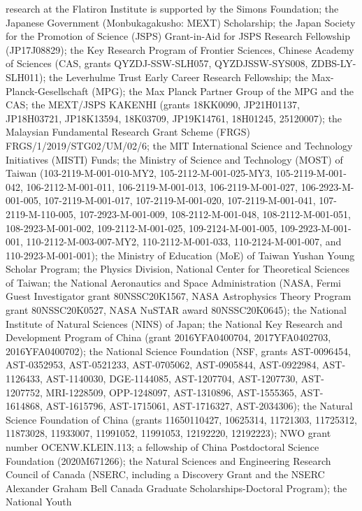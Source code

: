 research at the Flatiron Institute is supported by the Simons Foundation; 
the Japanese Government (Monbukagakusho:
MEXT) Scholarship; the Japan Society for
the Promotion of Science (JSPS) Grant-in-Aid for JSPS
Research Fellowship (JP17J08829); the Key Research
Program of Frontier Sciences, Chinese Academy of
Sciences (CAS, grants QYZDJ-SSW-SLH057, QYZDJSSW-SYS008, ZDBS-LY-SLH011); 
the Leverhulme Trust Early Career Research
Fellowship; the Max-Planck-Gesellschaft (MPG);
the Max Planck Partner Group of the MPG and the
CAS; the MEXT/JSPS KAKENHI (grants 18KK0090, JP21H01137,
JP18H03721, JP18K13594, 18K03709, JP19K14761, 18H01245, 25120007); the Malaysian Fundamental Research Grant Scheme (FRGS) FRGS/1/2019/STG02/UM/02/6; the MIT International Science
and Technology Initiatives (MISTI) Funds; 
the Ministry of Science and Technology (MOST) of Taiwan (103-2119-M-001-010-MY2, 105-2112-M-001-025-MY3, 105-2119-M-001-042, 106-2112-M-001-011, 106-2119-M-001-013, 106-2119-M-001-027, 106-2923-M-001-005, 107-2119-M-001-017, 107-2119-M-001-020, 107-2119-M-001-041, 107-2119-M-110-005, 107-2923-M-001-009, 108-2112-M-001-048, 108-2112-M-001-051, 108-2923-M-001-002, 109-2112-M-001-025, 109-2124-M-001-005, 109-2923-M-001-001, 110-2112-M-003-007-MY2, 110-2112-M-001-033, 110-2124-M-001-007, and 110-2923-M-001-001);
the Ministry of Education (MoE) of Taiwan Yushan Young Scholar Program;
the Physics Division, National Center for Theoretical Sciences of Taiwan;
the National Aeronautics and
Space Administration (NASA, Fermi Guest Investigator
grant 80NSSC20K1567, NASA Astrophysics Theory Program grant 80NSSC20K0527, NASA NuSTAR award 
80NSSC20K0645); 
the National
Institute of Natural Sciences (NINS) of Japan; the National
Key Research and Development Program of China
(grant 2016YFA0400704, 2017YFA0402703, 2016YFA0400702); the National
Science Foundation (NSF, grants AST-0096454,
AST-0352953, AST-0521233, AST-0705062, AST-0905844, AST-0922984, AST-1126433, AST-1140030,
DGE-1144085, AST-1207704, AST-1207730, AST-1207752, MRI-1228509, OPP-1248097, AST-1310896,  
AST-1555365, AST-1614868, AST-1615796, AST-1715061, AST-1716327,  AST-2034306); 
the Natural Science Foundation of China (grants 11650110427, 10625314, 11721303, 11725312, 11873028, 11933007, 11991052, 11991053, 12192220, 12192223);
NWO grant number OCENW.KLEIN.113; a 
fellowship of China Postdoctoral Science Foundation (2020M671266); the Natural
Sciences and Engineering Research Council of
Canada (NSERC, including a Discovery Grant and
the NSERC Alexander Graham Bell Canada Graduate
Scholarships-Doctoral Program); the National Youth
